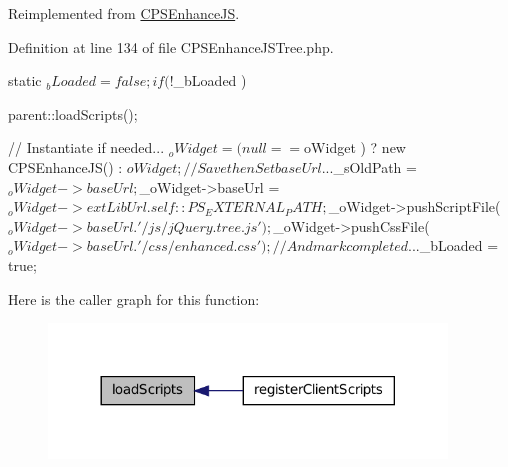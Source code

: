 Reimplemented from \hyperlink{classCPSEnhanceJS_a561cda05113b81fc962133829351f41e}{CPSEnhanceJS}.



Definition at line 134 of file CPSEnhanceJSTree.php.




\begin{DoxyCode}
    {
        static $_bLoaded = false;

        if ( ! $_bLoaded )
        {
            parent::loadScripts();

            //  Instantiate if needed...
            $_oWidget = ( null == $oWidget ) ? new CPSEnhanceJS() : $oWidget;

            //  Save then Set baseUrl...
            $_sOldPath = $_oWidget->baseUrl;
            $_oWidget->baseUrl = $_oWidget->extLibUrl . self::PS_EXTERNAL_PATH;

            $_oWidget->pushScriptFile( $_oWidget->baseUrl . '/js/jQuery.tree.js' 
      );
            $_oWidget->pushCssFile( $_oWidget->baseUrl . '/css/enhanced.css' );

            //  And mark completed...
            $_bLoaded = true;
        }
    }
\end{DoxyCode}




Here is the caller graph for this function:\nopagebreak
\begin{figure}[H]
\begin{center}
\leavevmode
\includegraphics[width=300pt]{classCPSEnhanceJSTree_a561cda05113b81fc962133829351f41e_icgraph}
\end{center}
\end{figure}


